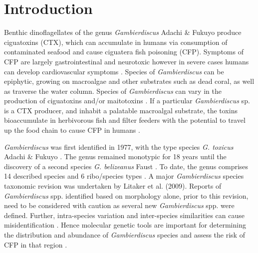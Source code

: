 \documentclass[12pt]{article}
\begin{document}
\newpage
\section*{Introduction}
Benthic dinoflagellates of the genus \emph{Gambierdiscus} Adachi \& Fukuyo produce ciguatoxins (CTX), which can accumulate in humans via consumption of contaminated seafood and cause ciguatera fish poisoning (CFP). Symptoms of CFP are largely gastrointestinal and neurotoxic however in severe cases humans can develop cardiovascular symptoms \citep{sims1987theoretical}. Species of \emph{Gambierdiscus} can be epiphytic, growing on macroalgae and other substrates such as dead coral, as well as traverse the water column. Species of \textit{Gambierdiscus} can vary in the production of ciguatoxins and/or maitotoxins \citep{chinain2010ciguatera,kohli2014high}. If a particular \emph{Gambierdiscus} sp. is a CTX producer, and inhabit a palatable macroalgal substrate, the toxins bioaccumulate in herbivorous fish and filter feeders with the potential to travel up the food chain to cause CFP in humans  \citep{chinain1997intraspecific,holmes1998gambierdiscus}. %

\emph{Gambierdiscus} was first identified in 1977, with the type species \emph{G. toxicus} Adachi \& Fukuyo \citep{adachi1979thecal}. The genus remained monotypic for 18 years until the discovery of a second species \emph{G. belizeanus} Faust \citep{faust1995observation}. To date, the genus comprises 14 described species and 6 ribo/species types
 \citep{smith2016new,fraga2016gambierdiscus,litaker2010global,adachi1979thecal,faust1995observation,chinain1999morphology,litaker2009taxonomy,dai2017taxonomic,nishimura2014morphology,rhodes2017new,kretzschmar2016characterization,fraga2011gambierdiscus,xu2014distribution,fraga2014genus} .
A major \emph{Gambierdiscus} species taxonomic revision was undertaken by Litaker et al. (2009). Reports of \emph{Gambierdiscus} spp. identified based on morphology alone, prior to this revision, need to be considered with caution as several new \emph{Gambierdiscus} spp. were defined. Further, intra-species variation and inter-species similarities can cause misidentification \citep{bravo2014cellular,kretzschmar2016characterization,kohli2014high}. Hence molecular genetic tools are important for determining the distribution and abundance of  \textit{Gambierdiscus} species and assess the risk of CFP in that region \citep{kohli2014high,kretzschmar2016characterization}. \\
\end{document}
